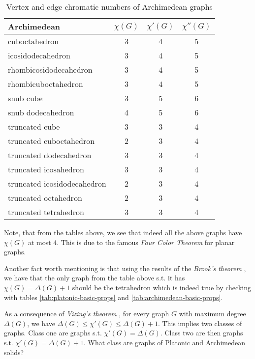 \begin{table}[H]
\centering
\begin{tabular}{l@{\hspace{1.5cm}}ccc}
\toprule
\textbf{Archimedean} & \textbf{$\chi(G)$} & \textbf{$\chi'(G)$} & \textbf{$\chi''(G)$} \\
\midrule
cuboctahedron & 3 & 4 & 5 \\
icosidodecahedron & 3 & 4 & 5 \\
rhombicosidodecahedron & 3 & 4 & 5 \\
rhombicuboctahedron & 3 & 4 & 5 \\
snub cube & 3 & 5 & 6 \\
snub dodecahedron & 4 & 5 & 6 \\
truncated cube & 3 & 3 & 4 \\
truncated cuboctahedron & 2 & 3 & 4 \\
truncated dodecahedron & 3 & 3 & 4 \\
truncated icosahedron & 3 & 3 & 4 \\
truncated icosidodecahedron & 2 & 3 & 4 \\
truncated octahedron & 2 & 3 & 4 \\
truncated tetrahedron & 3 & 3 & 4 \\
\bottomrule
\end{tabular}
\caption{Vertex and edge chromatic numbers of Archimedean graphs}
\label{tab:archimedean-chrom-nums}
\end{table}

Note, that from the tables above, we see that indeed all the above graphs have $\chi(G)$ at most 4. This is due to the famous \textit{Four Color Theorem} \cite{appelhaken76} for planar graphs.

\begin{highlight}

Another fact worth mentioning is that using the results of the \textit{Brook's theorem} \cite{brooks41}, we have that the only graph from the table above s.t. it has $\chi(G) = \Delta(G) + 1$ should be the tetrahedron which is indeed true by checking with tables \ref{tab:platonic-basic-props} and \ref{tab:archimedean-basic-props}. 

\end{highlight}

As a consequence of \textit{Vizing's theorem} \cite{misra92}, for every graph $G$ with maximum degree $\Delta(G)$, we have $\Delta(G) \leq \chi'(G) \leq \Delta(G) + 1$. This implies two classes of graphs. Class one are graphs s.t. $\chi'(G) = \Delta(G)$. Class two are then graphs s.t. $\chi'(G) = \Delta(G) + 1$. What class are graphs of Platonic and Archimedean solids?

